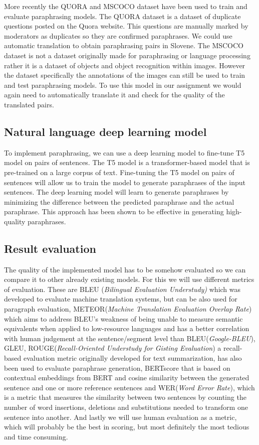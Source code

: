 \documentclass[fleqn,moreauthors,10pt]{ds_report}
\begin{document}
More recently the QUORA\cite{sambit7_quora_dataset} and MSCOCO\cite{lin2014microsoft} dataset have been used to train and evaluate paraphrasing models. The QUORA dataset is a dataset of duplicate questions posted on the Quora website. This questions are manually marked by moderators as duplicates so they are confirmed paraphrases. We could use automatic translation to obtain paraphrasing pairs in Slovene. The MSCOCO dataset is not a dataset originally made for paraphrasing or language processing rather it is a dataset of objects and object recognition within images. However the dataset specifically the annotations of the images can still be used to train and test paraphrasing models. To use this model in our assignment we would again need to automatically translate it and check for the quality of the translated pairs.

\subsection{Natural language deep learning model}
To implement paraphrasing, we can use a deep learning model to fine-tune T5 model on pairs of sentences. The T5 model is a transformer-based model that is pre-trained on a large corpus of text. Fine-tuning the T5 model on pairs of sentences will allow us to train the model to generate paraphrases of the input sentences. The deep learning model will learn to generate paraphrases by minimizing the difference between the predicted paraphrase and the actual paraphrase. This approach has been shown to be effective in generating high-quality paraphrases.

\subsection{Result evaluation}
The quality of the implemented model has to be somehow evaluated so we can compare it to other already existing models. For this we will use different metrics of evaluation. These are BLEU (\textit{Bilingual Evaluation Understudy)} which was developed to evaluate machine translation systems, but can be also used for paragraph evaluation, METEOR(\textit{Machine Translation Evaluation Overlap Rate}) which aims to address BLEU's weakness of being unable to measure semantic equivalents when applied to low-resource languages and has a better correlation with human judgement at the sentence/segment level than BLEU(\textit{Google-BLEU}), GLEU, ROUGE(\textit{Recall-Oriented Understudy for Gisting Evaluation}) a recall-based evaluation metric originally developed for text summarization, has also been used to evaluate paraphrase generation, BERTscore that is based on contextual embeddings from BERT and cosine similarity between the generated sentence and one or more reference sentences and WER(\textit{Word Error Rate}), which is a metric that measures the similarity between two sentences by counting the number of word insertions, deletions and substitutions needed to transform one sentence into another\cite{zhou2021paraphrase}. And lastly we will use human evaluation as a metric, which will probably be the best in scoring, but most definitely the most tedious and time consuming.
\end{document}
